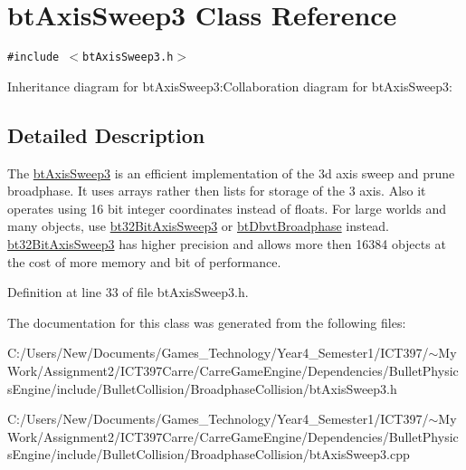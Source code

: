 \hypertarget{classbt_axis_sweep3}{
\section{btAxisSweep3 Class Reference}
\label{classbt_axis_sweep3}
}
{\tt \#include $<$btAxisSweep3.h$>$}

Inheritance diagram for btAxisSweep3:Collaboration diagram for btAxisSweep3:

\subsection{Detailed Description}
The \hyperlink{classbt_axis_sweep3}{btAxisSweep3} is an efficient implementation of the 3d axis sweep and prune broadphase. It uses arrays rather then lists for storage of the 3 axis. Also it operates using 16 bit integer coordinates instead of floats. For large worlds and many objects, use \hyperlink{classbt32_bit_axis_sweep3}{bt32BitAxisSweep3} or \hyperlink{structbt_dbvt_broadphase}{btDbvtBroadphase} instead. \hyperlink{classbt32_bit_axis_sweep3}{bt32BitAxisSweep3} has higher precision and allows more then 16384 objects at the cost of more memory and bit of performance. 

Definition at line 33 of file btAxisSweep3.h.

The documentation for this class was generated from the following files:\begin{CompactItemize}
\item 
C:/Users/New/Documents/Games\_\-Technology/Year4\_\-Semester1/ICT397/$\sim$My Work/Assignment2/ICT397Carre/CarreGameEngine/Dependencies/BulletPhysicsEngine/include/BulletCollision/BroadphaseCollision/btAxisSweep3.h\item 
C:/Users/New/Documents/Games\_\-Technology/Year4\_\-Semester1/ICT397/$\sim$My Work/Assignment2/ICT397Carre/CarreGameEngine/Dependencies/BulletPhysicsEngine/include/BulletCollision/BroadphaseCollision/btAxisSweep3.cpp\end{CompactItemize}

